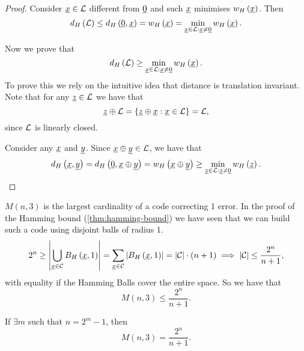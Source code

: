 \begin{proof}
	Consider $\underline{x} \in \mathcal{L}$ different from $\underline{0}$ and such $\underline{x}$ minimises $w_H\left(\underline{x}\right)$.
	Then
	\begin{equation*}
		d_H \left({\mathcal{L}}\right) \le d_H \left({\underline{0}, \underline{x}}\right) = w_H\left(\underline{x}\right) = \min_{\underline{x} \in \mathcal{L} : \underline{x} \neq \underline{0}} w_H\left(\underline{x}\right).
	\end{equation*}

	Now we prove that
	\begin{equation*}
		d_H \left({\mathcal{L}}\right) \ge \min_{\underline{x} \in \mathcal{L} : \underline{x} \neq \underline{0}} w_H\left(\underline{x}\right).
	\end{equation*}
	To prove this we rely on the intuitive idea that distance is translation invariant.
	Note that for any $\underline{z} \in \mathcal{L}$ we have that
	\begin{equation*}
		\underline{z} \oplus \mathcal{L}
		=
		\left\{ \underline{z} \oplus \underline{x} : \underline{x} \in \mathcal{L} \right\}
		=
		\mathcal{L},
	\end{equation*}
	since $\mathcal{L}$ is linearly closed.

	Consider any $\underline{x}$ and $\underline{y}$.
	Since $\underline{x} \oplus \underline{y} \in \mathcal{L}$, we have that
	\begin{equation*}
		d_H \left({\underline{x}, \underline{y}}\right)
		=
		d_H \left({\underline{0}, \underline{x} \oplus \underline{y}}\right)
		=
		w_H\left(\underline{x} \oplus \underline{y}\right)
		\ge
		\min_{\underline{z} \in \mathcal{L} : \underline{z} \neq \underline{0}} w_H\left(\underline{z}\right). \qedhere
	\end{equation*}
\end{proof}

$M(n, 3)$ is the largest cardinality of a code correcting 1 error.
In the proof of the Hamming bound (\cref{thm:hamming-bound}) we have seen that we can build such a code using disjoint balls of radius 1.
\begin{equation*}
	2^n
	\ge
	\left|{\bigcup_{\underline{x} \in \mathcal{C}} B_H\left(\underline{x}, 1\right)}\right|
	=
	\sum_{\underline{x} \in \mathcal{C}} \left|{B_H\left(\underline{x}, 1\right)}\right|
	=
	\left|{\mathcal{C}}\right| \cdot (n + 1)
	\implies
	\left|{\mathcal{C}}\right| \le \frac{2^n}{n+1},
\end{equation*}
with equality if the Hamming Balls cover the entire space.
So we have that
\begin{equation*}
	M(n, 3) \le \frac{2^n}{n+1}.
\end{equation*}

\begin{thm}[Hamming]
	If $\exists m$ such that $n = 2^m - 1$, then
	\begin{equation*}
		M(n, 3) = \frac{2^n}{n+1}.
	\end{equation*}
\end{thm}

